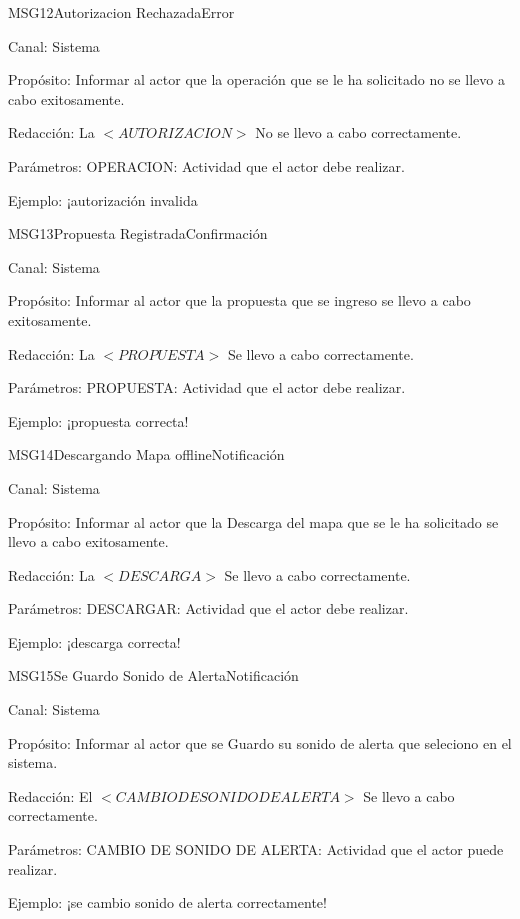 \begin{mensaje}{MSG12}{Autorizacion Rechazada}{Error \msgError}
	\item[Canal:] Sistema
    \item[Propósito:] Informar al actor que la operación que se le ha solicitado no se llevo a cabo exitosamente.
    \item[Redacción:] La $<AUTORIZACION>$ No se llevo a cabo correctamente.
    \item[Parámetros:] OPERACION: Actividad que el actor debe realizar.
    \item[Ejemplo:] ¡autorización invalida
\end{mensaje}
\begin{mensaje}{MSG13}{Propuesta Registrada}{Confirmación \msgConfirm}
	\item[Canal:] Sistema
    \item[Propósito:] Informar al actor que la propuesta que se ingreso se llevo a cabo exitosamente.
    \item[Redacción:] La $<PROPUESTA>$ Se llevo a cabo correctamente.
    \item[Parámetros:] PROPUESTA: Actividad que el actor debe realizar.
    \item[Ejemplo:]¡propuesta correcta!
\end{mensaje}
\begin{mensaje}{MSG14}{Descargando Mapa offline}{Notificación \msgNotif}
	\item[Canal:] Sistema
    \item[Propósito:] Informar al actor que la Descarga del mapa que se le ha solicitado se llevo a cabo exitosamente.
    \item[Redacción:] La $<DESCARGA>$ Se llevo a cabo correctamente.
    \item[Parámetros:] DESCARGAR: Actividad que el actor debe realizar.
    \item[Ejemplo:] ¡descarga correcta!
\end{mensaje}
\begin{mensaje}{MSG15}{Se Guardo Sonido de Alerta}{Notificación \msgNotif}
	\item[Canal:] Sistema
    \item[Propósito:] Informar al actor que  se Guardo su sonido de alerta  que seleciono en el sistema.
    \item[Redacción:] El $<CAMBIO DE SONIDO DE ALERTA>$ Se llevo a cabo correctamente.
    \item[Parámetros:] CAMBIO DE SONIDO DE ALERTA: Actividad que el actor puede realizar.
    \item[Ejemplo:] ¡se cambio sonido de alerta  correctamente!
\end{mensaje}
